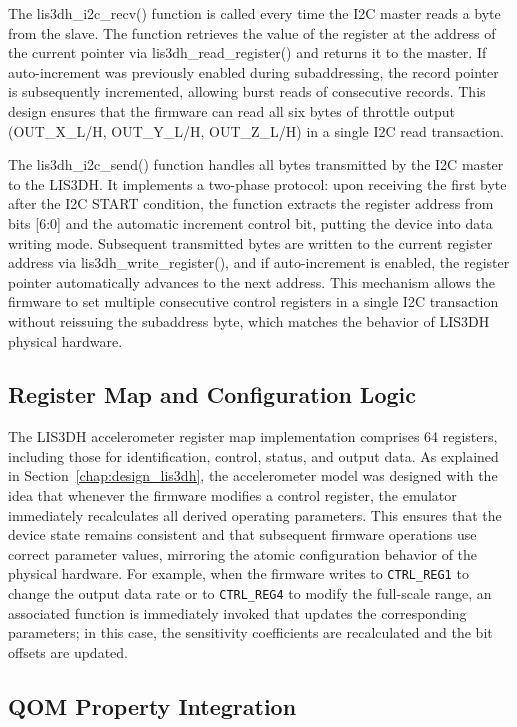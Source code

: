 The lis3dh\_i2c\_recv() function is called every time the I2C master reads a byte from the slave. The function retrieves the value of the register at the address of the current pointer via lis3dh\_read\_register() and returns it to the master. If auto-increment was previously enabled during subaddressing, the record pointer is subsequently incremented, allowing burst reads of consecutive records. This design ensures that the firmware can read all six bytes of throttle output (OUT\_X\_L/H, OUT\_Y\_L/H, OUT\_Z\_L/H) in a single I2C read transaction.


The lis3dh\_i2c\_send() function handles all bytes transmitted by the I2C master to the LIS3DH. It implements a two-phase protocol: upon receiving the first byte after the I2C START condition, the function extracts the register address from bits [6:0] and the automatic increment control bit, putting the device into data writing mode. Subsequent transmitted bytes are written to the current register address via lis3dh\_write\_register(), and if auto-increment is enabled, the register pointer automatically advances to the next address. This mechanism allows the firmware to set multiple consecutive control registers in a single I2C transaction without reissuing the subaddress byte, which matches the behavior of LIS3DH physical hardware.


\subsection{Register Map and Configuration Logic}

The LIS3DH accelerometer register map implementation comprises 64 registers, including 
those for identification, control, status, and output data. As explained in 
Section~\ref{chap:design_lis3dh}, the accelerometer model was designed with the idea 
that whenever the firmware modifies a control register, the emulator immediately 
recalculates all derived operating parameters. This ensures that the device state remains 
consistent and that subsequent firmware operations use correct parameter values, 
mirroring the atomic configuration behavior of the physical hardware. For example, when 
the firmware writes to \texttt{CTRL\_REG1} to change the output data rate or to 
\texttt{CTRL\_REG4} to modify the full-scale range, an associated function is 
immediately invoked that updates the corresponding parameters; in this case, the 
sensitivity coefficients are recalculated and the bit offsets are updated.


\subsection{QOM Property Integration}


